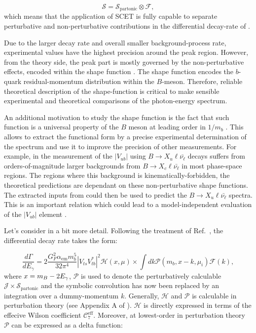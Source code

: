 \begin{equation}\label{eq:factorisation}
    \mathcal{S} = \mathcal{S}_{\mathrm{partonic}} \otimes \mathcal{F},
\end{equation}
which means that the application of SCET is fully capable to separate perturbative and non-perturbative contributions in the differential decay-rate of \BtoXsgamma.

Due to the larger \BtoXsgamma decay rate and overall smaller background-process rate, experimental values have the highest precision around the peak region.
However, from the theory side, the peak part is mostly governed by the non-perturbative effects, encoded within the shape function \cite{Ligeti:2008ac}.
The shape function encodes the $b$-quark residual-momentum distribution within the $B$-meson. 
Therefore, reliable theoretical description of the shape-function is critical to make sensible experimental and theoretical comparisons of the photon-energy spectrum. 

An additional motivation to study the shape function is the fact that such function is a universal property of the $B$ meson at leading order in $1/m_b$ \cite{Neubert:1993um,Bigi:1993ex}.
This allows to extract the functional form by a precise experimental determination of the \BtoXsgamma spectrum and use it to improve the precision of other measurements.
For example, in the measurement of the $|V_{ub}|$ using $B\rightarrow X_u \ell \bar{\nu_{\ell}}$ decays suffers from orders-of-magnitude larger backgrounds from $B\rightarrow X_c \ell \bar{\nu_{\ell}}$ in most phase-space regions.
The regions where this background is kinematically-forbidden, the theoretical predictions are dependant on these non-perturbative shape functions.
The extracted inputs from \BtoXsgamma could then be used to predict the $B\rightarrow X_u \ell \bar{\nu_{\ell}}$ spectra.
This is an important relation which could lead to a model-independent evaluation of the $|V_{ub}|$ element \cite{Neubert:1993um}.

Let's consider  in a bit more detail.
Following the treatment of Ref.~\cite{Ligeti:2008ac}, the differential decay rate takes the form:

\begin{equation}\label{eq:differential_decay_simba}
    \frac{d\Gamma}{dE_{\gamma}} = 2\frac{G_F^2\alpha_{\mathrm{em}} m_b^5}{32\pi^4}|V_{ts}V_{tb}^*|^2 \mathcal{H}(x, \mu) \times \int dk \mathcal{P}(m_b, x - k, \mu_i) \mathcal{F}(k),
\end{equation}
where $x=m_B-2{E_{\gamma}}$, $\mathcal{P}$ is used to denote the perturbatively calculable $\mathcal{J}\times\mathcal{S_{\mathrm{partonic}}}$ and the symbolic convolution has now been replaced by an integration over a dummy-momentum $k$.
Generally, $\mathcal{H}$ and $\mathcal{P}$ is calculable in perturbation theory (see Appendix A of \cite{Ligeti:2008ac}).
$\mathcal{H}$ is directly expressed in terms of the effecive Wilson coefficient $\mathcal{C}_7^{\mathrm{eff}}$. 
Moreover, at lowest-order in perturbation theory $\mathcal{P}$ can be expressed as a delta function:

